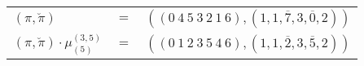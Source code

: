 \begin{example}\label{example:NLNYPHRB}
  \hfill \break
  \begin{tabular}{lll}
    $(\pi,\breve\pi)$ & $=$ & $(({0}~{4}~{5}~{3}~{2}~{1}~{6}),(1,1,\overline{7},3,\overline{0},2))$ \\
    $(\pi,\breve\pi) \cdot \mu^{(3,5)}_{(5)}$ & $=$ & $(({0}~{1}~{2}~{3}~{5}~{4}~{6}),(1,1,\overline{2},3,\overline{5},2))$ \\
  \end{tabular}
\end{example}